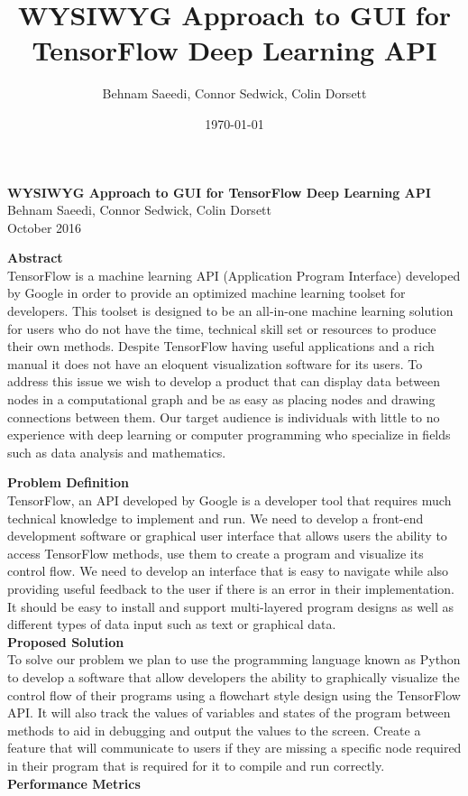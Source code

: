 \documentclass[a4paper,10pt]{IEEETran}
\title{WYSIWYG Approach to GUI for TensorFlow Deep Learning API}
\author{Behnam Saeedi, Connor Sedwick, Colin Dorsett}
\date{\today}
\newcommand*\Title{WYSIWYG Approach to GUI for TensorFlow Deep Learning API}
\newcommand*\Date{October 2016}
\newcommand*\Author{Behnam Saeedi, Connor Sedwick, Colin Dorsett}
\begin{document}
	\begin{titlepage}
		\vspace*{\fill}
			\begin{center}
				\noindent \textbf{\Huge\Title} \\
				\large\Author \\
				\large\Date \\
			\end{center}
			\noindent \textbf{Abstract} \\
			\indent TensorFlow is a machine learning API (Application Program Interface) developed by Google in order to provide an optimized machine learning toolset for developers.
			 This toolset is designed to be an all-in-one machine learning solution for users who do not have the time, technical skill set or resources to produce their own methods.
			 Despite TensorFlow having useful applications and a rich manual it does not have an eloquent visualization software for its users.
			 To address this issue we wish to develop a product that can display data between nodes in a computational graph and be as easy as placing nodes and drawing connections between them.
			 Our target audience is individuals with little to no experience with deep learning or computer programming who specialize in fields such as data analysis and mathematics.\\
		\vspace*{\fill}
	\end{titlepage}

	\noindent \textbf{Problem Definition}\\
	\indent TensorFlow, an API developed by Google is a developer tool that requires much technical knowledge to implement and run.
	 We need to develop a front-end development software or graphical user interface that allows users the ability to access TensorFlow methods, use them to create a program and visualize its control flow.
	 We need to develop an interface that is easy to navigate while also providing useful feedback to the user if there is an error in their implementation.
	 It should be easy to install and support multi-layered program designs as well as different types of data input such as text or graphical data.\\

	\noindent \textbf{Proposed Solution}\\
	\indent To solve our problem we plan to use the programming language known as Python to develop a software that allow developers the ability to graphically visualize the control flow of their programs using a flowchart style design using the TensorFlow API.
	 It will also track the values of variables and states of the program between methods to aid in debugging and output the values to the screen.
	 Create a feature that will communicate to users if they are missing a specific node required in their program that is required for it to compile and run correctly.\\

	\noindent \textbf{Performance Metrics}\\
	\indent 
\end{document}
